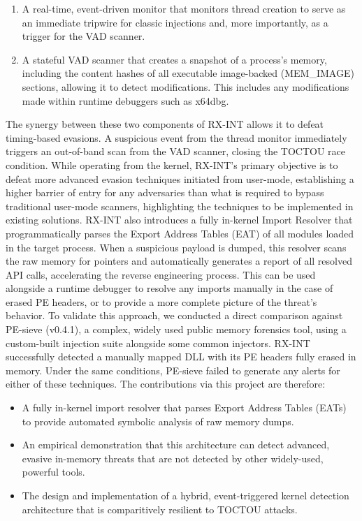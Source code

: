 \documentclass[journal]{IEEEtran}
\begin{document}
\begin{enumerate}
\item A real-time, event-driven monitor that monitors thread creation to serve as an immediate tripwire for classic injections and, more importantly, as a trigger for the VAD scanner.
\item A stateful VAD scanner that creates a snapshot of a process's memory, including the content hashes of all executable image-backed (MEM\_IMAGE) sections, allowing it to detect modifications. This includes any modifications made within runtime debuggers such as x64dbg.
\end{enumerate}
The synergy between these two components of RX-INT allows it to defeat timing-based evasions. A suspicious event from the thread monitor immediately triggers an out-of-band scan from the VAD scanner, closing the TOCTOU race condition. While operating from the kernel, RX-INT's primary objective is to defeat more advanced evasion techniques initiated from user-mode, establishing a higher barrier of entry for any adversaries than what is required to bypass traditional user-mode scanners, highlighting the techniques to be implemented in existing solutions. RX-INT also introduces a fully in-kernel Import Resolver that programmatically parses the Export Address Tables (EAT) of all modules loaded in the target process. When a suspicious payload is dumped, this resolver scans the raw memory for pointers and automatically generates a report of all resolved API calls, accelerating the reverse engineering process. This can be used alongside a runtime debugger to resolve any imports manually in the case of erased PE headers, or to provide a more complete picture of the threat's behavior.
To validate this approach, we conducted a direct comparison against PE-sieve (v0.4.1), a complex, widely used public memory forensics tool, using a custom-built injection suite alongside some common injectors. RX-INT successfully detected a manually mapped DLL with its PE headers fully erased in memory. Under the same conditions, PE-sieve failed to generate any alerts for either of these techniques.
The contributions via this project are therefore:
\begin{itemize}
    \item A fully in-kernel import resolver that parses Export Address Tables (EATs) to provide automated symbolic analysis of raw memory dumps.
    \item An empirical demonstration that this architecture can detect advanced, evasive in-memory threats that are not detected by other widely-used, powerful tools.
    \item The design and implementation of a hybrid, event-triggered kernel detection architecture that is comparitively resilient to TOCTOU attacks.
\end{itemize}
\end{document}
